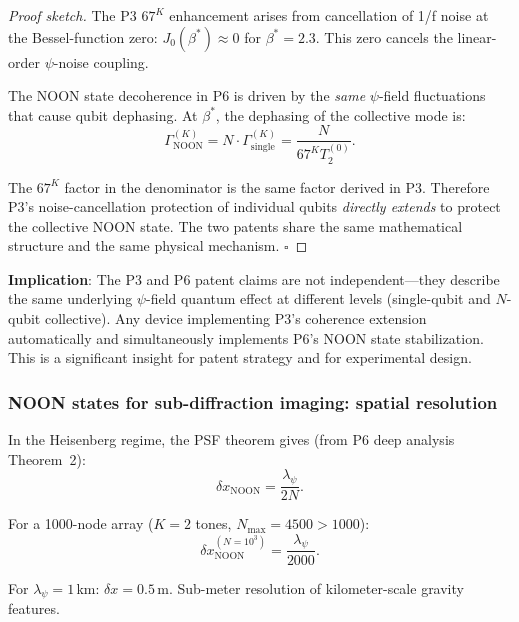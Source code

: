 \documentclass[11pt]{article}
\theoremstyle{definition}
\theoremstyle{remark}
\begin{document}
\begin{proof}[Proof sketch]
The P3 $67^K$ enhancement arises from cancellation of 1/f noise at
the Bessel-function zero: $J_0(\beta^*) \approx 0$ for $\beta^* = 2.3$.
This zero cancels the linear-order $\psi$-noise coupling.

The NOON state decoherence in P6 is driven by the \emph{same}
$\psi$-field fluctuations that cause qubit dephasing. At $\beta^*$,
the dephasing of the collective mode is:
\begin{equation}
\Gamma_{\mathrm{NOON}}^{(K)} = N \cdot \Gamma_{\mathrm{single}}^{(K)}
= \frac{N}{67^K T_2^{(0)}}.
\end{equation}

The $67^K$ factor in the denominator is the same factor derived in P3.
Therefore P3's noise-cancellation protection of individual qubits
\emph{directly extends} to protect the collective NOON state. The two
patents share the same mathematical structure and the same physical
mechanism. \hfill$\square$
\end{proof}

\textbf{Implication}: The P3 and P6 patent claims are not independent---they
describe the same underlying $\psi$-field quantum effect at different
levels (single-qubit and $N$-qubit collective). Any device implementing
P3's coherence extension automatically and simultaneously implements P6's
NOON state stabilization. This is a significant insight for patent strategy
and for experimental design.

\subsubsection{NOON states for sub-diffraction imaging: spatial resolution}

In the Heisenberg regime, the PSF theorem gives (from P6 deep analysis
Theorem~2):
\begin{equation}
\delta x_{\mathrm{NOON}} = \frac{\lambda_\psi}{2N}.
\end{equation}

For a 1000-node array ($K=2$ tones, $N_{\max} = 4500 > 1000$):
\begin{equation}
\delta x_{\mathrm{NOON}}^{(N=10^3)} = \frac{\lambda_\psi}{2000}.
\end{equation}

For $\lambda_\psi = 1$\,km: $\delta x = 0.5$\,m. Sub-meter resolution
of kilometer-scale gravity features.

\end{document}
